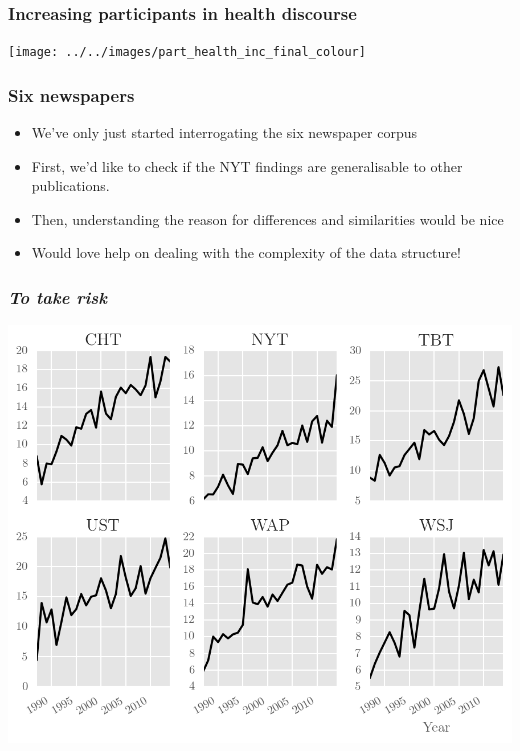 \documentclass{beamer}       %
\begin{document}
\begin{frame}
    \frametitle{Increasing participants in health discourse}
    \centering
    \texttt{[image: ../../images/part\_health\_inc\_final\_colour]}
\end{frame}

\begin{frame}\frametitle{Six newspapers}
\begin{itemize}
\item We've only just started interrogating the six newspaper corpus
\item First, we'd like to check if the NYT findings are generalisable to other publications.
\item Then, understanding the reason for differences and similarities would be nice
\item Would love help on dealing with the complexity of the data structure!
\end{itemize}
\end{frame}

\begin{frame}\frametitle{\emph{To take risk}}
    \centering
    \includegraphics[width=1\textwidth]{../../images/to-put-at-risk}
\end{frame}
\end{document}
